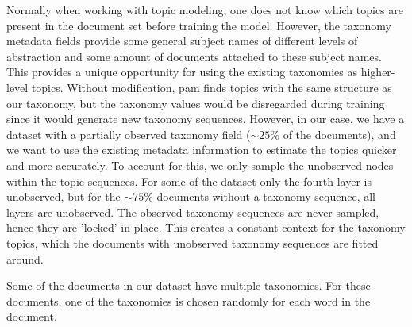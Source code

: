 




Normally when working with topic modeling, one does not know which topics are present in the document set before training the model.
However, the taxonomy metadata fields provide some general subject names of different levels of abstraction and some amount of documents attached to these subject names.
This provides a unique opportunity for using the existing taxonomies as higher-level topics.
Without modification, \gls{pam} finds topics with the same structure as our taxonomy, but the taxonomy values would be disregarded during training since it would generate new taxonomy sequences.
However, in our case, we have a dataset with a partially observed taxonomy field (${\sim}25\%$ of the documents), and we want to use the existing metadata information to estimate the topics quicker and more accurately.
To account for this, we only sample the unobserved nodes within the topic sequences.
For some of the dataset only the fourth layer is unobserved, but for the ${\sim}75\%$ documents without a taxonomy sequence, all layers are unobserved.
The observed taxonomy sequences are never sampled, hence they are 'locked' in place.
This creates a constant context for the taxonomy topics, which the documents with unobserved taxonomy sequences are fitted around.

Some of the documents in our dataset have multiple taxonomies.
For these documents, one of the taxonomies is chosen randomly for each word in the document. 
